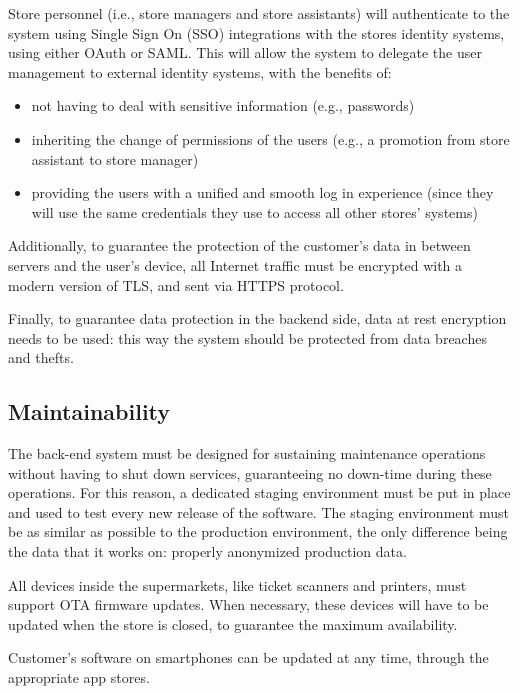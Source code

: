 \documentclass[../../main.tex]{subfiles}
\begin{document}
	Store personnel (i.e., store managers and store assistants) will authenticate to the system using Single Sign On (SSO) integrations with the stores identity systems, using either OAuth or SAML. This will allow the system to delegate the user management to external identity systems, with the benefits of:
	\begin{itemize}
		\item not having to deal with sensitive information (e.g., passwords) \\
		\item inheriting the change of permissions of the users (e.g., a promotion from store assistant to store manager) \\
		\item providing the users with a unified and smooth log in experience (since they will use the same credentials they use to access all other stores' systems)
	\end{itemize}

	Additionally, to guarantee the protection of the customer's data in between servers and the 
	user's device, all Internet traffic must be encrypted with a modern version of TLS, and sent via HTTPS protocol.

	Finally, to guarantee data protection in the backend side, data at rest encryption needs to be used: this way the system should be protected 
	from data breaches and thefts.

	\subsection{Maintainability}

	The back-end system must be designed for sustaining maintenance operations without having to 
	shut down services, guaranteeing no down-time during these operations. For this reason, a dedicated staging environment must be put in place and used to test every new release of the software. The staging environment must be as similar as possible to the production environment, the only difference being the data that it works on: properly anonymized production data.

	All devices inside the supermarkets, like ticket scanners and printers, must support OTA firmware updates. When necessary, these devices will have to be updated when the store is closed, to guarantee the maximum availability.

	Customer's software on smartphones can be updated at any time, through the appropriate app stores.
\end{document}
